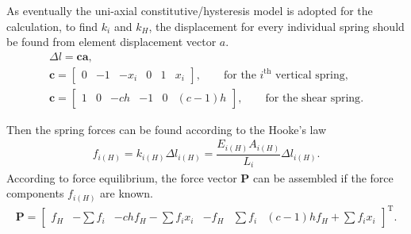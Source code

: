 \documentclass[3p]{elsarticle}
\newcommand*{\mT}{\mathrm{T}}
\begin{document}
As eventually the uni-axial constitutive/hysteresis model is adopted for the calculation, to find $k_i$ and $k_H$, the displacement for every individual spring should be found from element displacement vector $a$.
\begin{gather}
\Delta{}l=\mathbold{ca},\label{A22}\\
\mathbold{c}=\left[\begin{array}{cccccc}
	0 & -1 & -x_i & 0 & 1 & x_i
\end{array}\right],\qquad\text{for the $i^{\mathrm{th}}$ vertical spring},\\
\mathbold{c}=\left[\begin{array}{cccccc}
	1 & 0 & -ch & -1 & 0 & (c-1)h
\end{array}\right],\qquad\text{for the shear spring}.
\end{gather}

Then the spring forces can be found according to the Hooke's law
\begin{gather}
f_{i(H)}=k_{i(H)}\Delta{}l_{i(H)}=\dfrac{E_{i(H)}A_{i(H)}}{L_i}\Delta{}l_{i(H)}.\label{A23}
\end{gather}
According to force equilibrium, the force vector $\mathbold{P}$ can be assembled if the force components $f_{i(H)}$ are known.
\begin{gather}
\mathbold{P}=\left[\begin{array}{cccccc}
	f_H & -\sum{}f_i & -chf_H-\sum{}f_ix_i & -f_H & \sum{}f_i & (c-1)hf_H+\sum{}f_ix_i
\end{array}\right]^\mT.\label{A24}
\end{gather}
\end{document}
